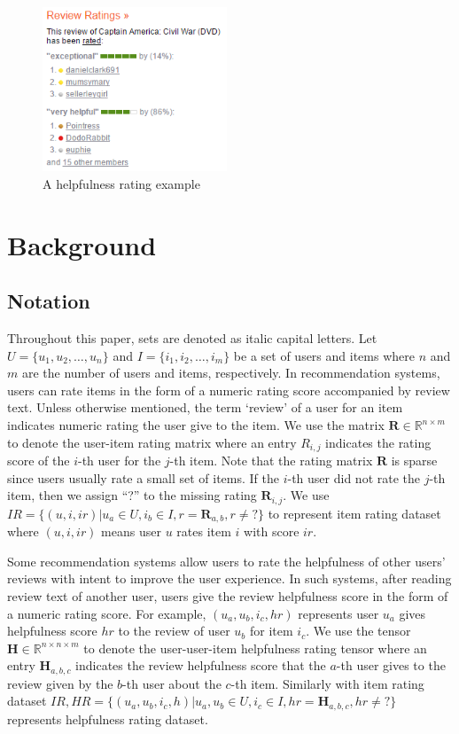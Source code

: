 \documentclass[master,english,final]{kaist-ucs}
\begin{document}
\begin{figure}[h]
    \centerline{\includegraphics[width=5.5cm]{figure/helpfulness_rating_example}}
    \caption{ A helpfulness rating example    } \label{helpfulness_rating_example}
\end{figure}

\chapter{Background}
\section{Notation}

Throughout this paper, sets are denoted as italic capital letters.
Let $U = \{u_1,u_2,…,u_n\}$ and $I = \{i_1,i_2,…,i_m\}$  be a set of users and items where $n$ and $m$ are the number of users and items, respectively.
In recommendation systems, users can rate items in the form of a numeric rating score accompanied by review text.
Unless otherwise mentioned, the term ‘review’ of a user for an item indicates numeric rating the user give to the item.
We use the matrix $ \bm{R} \in \mathbb{R}^{n \times m} $ to denote the user-item rating matrix where an entry $ R_{i,j} $ indicates the rating score of the $i$-th user for the $j$-th item.
Note that the rating matrix $\bm{R}$ is sparse since users usually rate a small set of items.
If the $i$-th user did not rate the $j$-th item, then we assign “?” to the missing rating $\bm{R}_{i,j}$.
We use $IR=\{(u,i,ir)| u_a \in U,i_b \in I,r=\bm{R}_{a,b},r \neq ? \}$ to represent item rating dataset where $(u,i,ir)$ means user $u$ rates item $i$ with score $ir$.

Some recommendation systems allow users to rate the helpfulness of other users’ reviews with intent to improve the user experience.
In such systems, after reading review text of another user, users give the review helpfulness score in the form of a numeric rating score.
For example, $(u_a,u_b,i_c,hr)$ represents user $u_a$ gives helpfulness score $hr$ to the review of user $u_b$ for item $i_c$.
We use the tensor $\bm{H} \in \mathbb{R}^{n \times n \times m}$ to denote the user-user-item helpfulness rating tensor where an entry $\bm{H}_{a,b,c}$ indicates the review helpfulness score that the $a$-th user gives to the review given by the $b$-th user about the $c$-th item.
Similarly with item rating dataset $IR, HR=\{(u_a,u_b,i_c,h)| u_a,u_b \in U,i_c \in I,hr=\bm{H}_{a,b,c},hr \neq ?\}$ represents helpfulness rating dataset.
\end{document}
